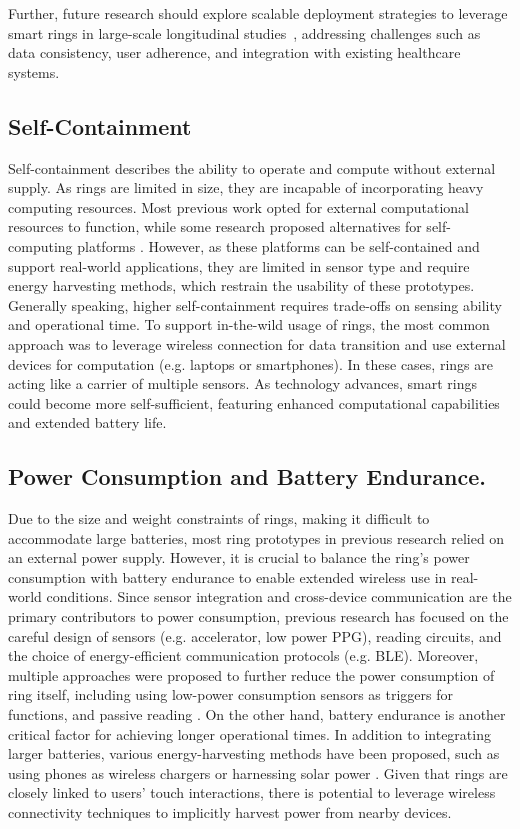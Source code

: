Further, future research should explore scalable deployment strategies to leverage smart rings in large-scale longitudinal studies~\cite{keeler2024biometrics}, addressing challenges such as data consistency, user adherence, and integration with existing healthcare systems. 

\subsection{Self-Containment}
Self-containment describes the ability to operate and compute without external supply. As rings are limited in size, they are incapable of incorporating heavy computing resources. Most previous work opted for external computational resources to function, while some research proposed alternatives for self-computing platforms \cite{magno2019self, gummeson2014energy}. However, as these platforms can be self-contained and support real-world applications, they are limited in sensor type and require energy harvesting methods, which restrain the usability of these prototypes. Generally speaking, higher self-containment requires trade-offs on sensing ability and operational time. To support in-the-wild usage of rings, the most common approach was to leverage wireless connection for data transition and use external devices for computation (e.g. laptops or smartphones). In these cases, rings are acting like a carrier of multiple sensors. As technology advances, smart rings could become more self-sufficient, featuring enhanced computational capabilities and extended battery life.


\subsection{Power Consumption and Battery Endurance.}
Due to the size and weight constraints of rings, making it difficult to accommodate large batteries, most ring prototypes in previous research relied on an external power supply. However, it is crucial to balance the ring's power consumption with battery endurance to enable extended wireless use in real-world conditions. Since sensor integration and cross-device communication are the primary contributors to power consumption, previous research \cite{boukhayma2021ring, chen2014mobiring, xu2022washring} has focused on the careful design of sensors (e.g. accelerator, low power PPG), reading circuits, and the choice of energy-efficient communication protocols (e.g. BLE). Moreover, multiple approaches were proposed to further reduce the power consumption of ring itself, including using low-power consumption sensors as triggers for functions, and passive reading \cite{takahashi2020telemetring, takahashi2024picoring}. On the other hand, battery endurance is another critical factor for achieving longer operational times. In addition to integrating larger batteries, various energy-harvesting methods have been proposed, such as using phones as wireless chargers or harnessing solar power \cite{nguyen2021smart, magno2019self, gummeson2014energy}. Given that rings are closely linked to users' touch interactions, there is potential to leverage wireless connectivity techniques to implicitly harvest power from nearby devices.

